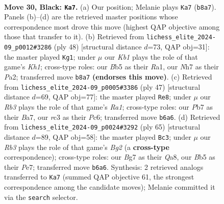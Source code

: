 \documentclass[11pt]{article}
\begin{document}
\clearpage

\begin{figure}[p]\centering
\begin{subfigure}{0.46\textwidth}\centering
\resizebox{\linewidth}{!}{%
\newchessgame
\chessboard[
  setfen={1k1r4/1p2p1bn/1r1pQ3/1b4p1/3PP3/1PR2P2/6PP/1K5R b - - 5 30},
  showmover=false,
  pgfstyle=straightmove, color=movearrow, markmove={b8-a7}
]}
\caption{}
\end{subfigure}\hfill
\begin{subfigure}{0.46\textwidth}\centering
\resizebox{\linewidth}{!}{%
\newchessgame
\chessboard[
  setfen={r3k3/p4p1p/4p2Q/2ppP3/8/2P2q2/PP3P1P/R4R1K w q - 7 25},
  showmover=false,
  pgfstyle=straightmove, color=movearrow, markmove={h1-g1}
]}
\caption{}
\end{subfigure}
\\[4pt]
\begin{subfigure}{0.46\textwidth}\centering
\resizebox{\linewidth}{!}{%
\newchessgame
\chessboard[
  setfen={r6k/bp3r1p/p1p2p1Q/8/P5b1/2PB4/1P4PP/R6K b - - 0 24},
  showmover=false,
  pgfstyle=straightmove, color=movearrow, markmove={a8-e8}
]}
\caption{}
\end{subfigure}\hfill
\begin{subfigure}{0.46\textwidth}\centering
\resizebox{\linewidth}{!}{%
\newchessgame
\chessboard[
  setfen={qr4k1/3Pp1bp/4P1p1/8/p7/5N1P/Qp3PP1/3R2K1 b - - 3 33},
  showmover=false,
  pgfstyle=straightmove, color=movearrow, markmove={g7-c3}
]}
\caption{}
\end{subfigure}
\caption{\textbf{Move 30, Black: \texttt{Ka7}.} (a) Our position; Melanie plays \texttt{Ka7} (\texttt{b8a7}). Panels (b)--(d) are the retrieved master positions whose correspondence most drove this move (highest QAP objective among those that transfer to it). (b) Retrieved from \texttt{lichess\_elite\_2024-09\_p0012\#3286} (ply 48) [structural distance $d$=73, QAP obj=31]: the master played \texttt{Kg1}; under $\mu$ our \emph{Kb1} plays the role of that game's \emph{Kh1}; cross-type roles: our \emph{B}b5 as their \emph{R}a1, our \emph{N}h7 as their \emph{P}a2; transferred move \texttt{b8a7} \textbf{(endorses this move)}. (c) Retrieved from \texttt{lichess\_elite\_2024-09\_p0005\#3386} (ply 47) [structural distance $d$=69, QAP obj=77]: the master played \texttt{Re8}; under $\mu$ our \emph{Rb3} plays the role of that game's \emph{Ra1}; cross-type roles: our \emph{P}b7 as their \emph{B}a7, our \emph{r}c3 as their \emph{P}c6; transferred move \texttt{b6a6}. (d) Retrieved from \texttt{lichess\_elite\_2024-09\_p0024\#3292} (ply 65) [structural distance $d$=89, QAP obj=58]: the master played \texttt{Bc3}; under $\mu$ our \emph{Rb3} plays the role of that game's \emph{Bg2} (a \textbf{cross-type} correspondence); cross-type roles: our \emph{B}g7 as their \emph{Q}a8, our \emph{B}b5 as their \emph{P}e7; transferred move \texttt{b6a6}. Synthesis: 2 retrieved analogs transferred to \texttt{Ka7} (summed QAP objective 61, the strongest correspondence among the candidate moves); Melanie committed it via the \texttt{search} selector.}
\label{fig:thought-m59}
\end{figure}
\end{document}
